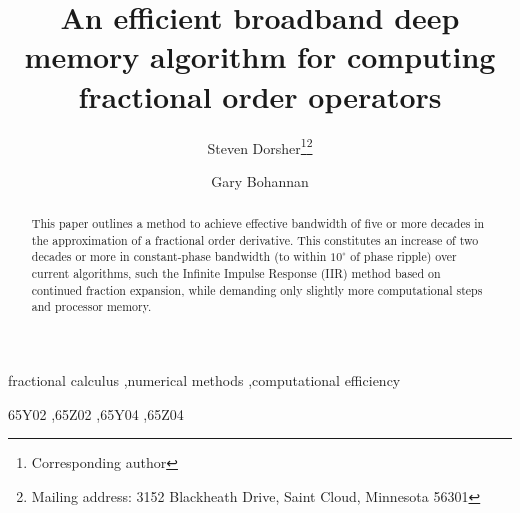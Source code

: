 \documentclass[preprint,12pt]{elsarticle}
\begin{document}
\begin{frontmatter}



\title{An efficient broadband deep memory algorithm for computing fractional order operators}


\author[Dorsher]{Steven Dorsher\footnote{Corresponding author}\footnote{Mailing address: 3152 Blackheath Drive, Saint Cloud, Minnesota 56301}}
\author[Bohannan]{Gary Bohannan}

\address[Dorsher]{Department of Chemistry and Physics, Saint Cloud State
  University \\
720 4th Avenue South, WSB 324, Saint Cloud, Minnesota, 56301, USA\\
1-952-686-1925\\
sdorsher@gmail.com}

\address[Bohannan]{Department of Chemistry and Physics, Saint Cloud State
  University \\
720 4th Avenue South, WSB 324, Saint Cloud, Minnesota, 56301, USA\\
gwbohannan@stcloudstate.edu}

 \begin{abstract}

This paper outlines a method to achieve effective bandwidth of five or
more decades in the approximation of a fractional order
derivative. This constitutes an increase of two decades or more in 
constant-phase bandwidth (to within $10^\circ$ of phase ripple) over
current algorithms, such the Infinite Impulse Response (IIR) method
based on continued fraction expansion, while demanding only slightly
more computational steps and processor memory.

\end{abstract}

\begin{keyword}
fractional calculus \sep numerical methods \sep computational efficiency

\MSC[2010] 65Y02 \sep 65Z02 \sep 65Y04 \sep 65Z04
\end{keyword}

\end{frontmatter}
\end{document}
